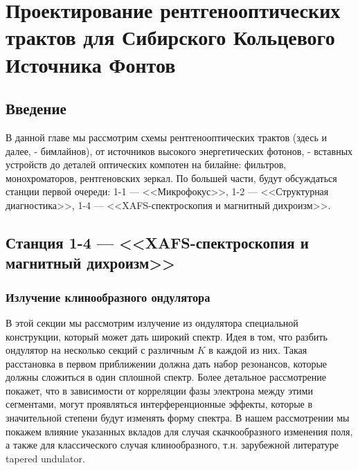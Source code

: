 \chapter{Проектирование рентгенооптических трактов для Сибирского Кольцевого Источника Фонтов}

\section{Введение}
В данной главе мы рассмотрим схемы рентгенооптических трактов (здесь и далее, - бимлайнов), от источников высокого энергетических фотонов, - вставных устройств до деталей оптических компотен на билайне: фильтров, монохроматоров, рентгеновских зеркал. По большей части, будут обсуждаться станции первой очереди: 1-1 --- <<Микрофокус>>, 1-2 --- <<Структурная диагностика>>, 1-4 --- <<XAFS-спектроскопия и магнитный дихроизм>>.  

\section{Станция 1-4 --- <<XAFS-спектроскопия и магнитный дихроизм>>}
\subsection{Излучение клинообразного ондулятора}
В этой секции мы рассмотрим излучение из ондулятора специальной конструкции, который может дать широкий спектр. Идея в том, что разбить ондулятор на несколько секций с различным $K$ в каждой из них. Такая расстановка в первом приближении должна дать набор резонансов, которые должны сложиться в один сплошной спектр. Более детальное рассмотрение покажет, что в зависимости от корреляции фазы электрона между этими сегментами, могут проявляться интерференционные эффекты, которые в значительной степени будут изменять форму спектра. В нашем рассмотрении мы покажем влияние указанных вкладов для случая скачкообразного изменения поля, а также для классического случая клинообразного, т.н. зарубежной литературе tapered undulator.

